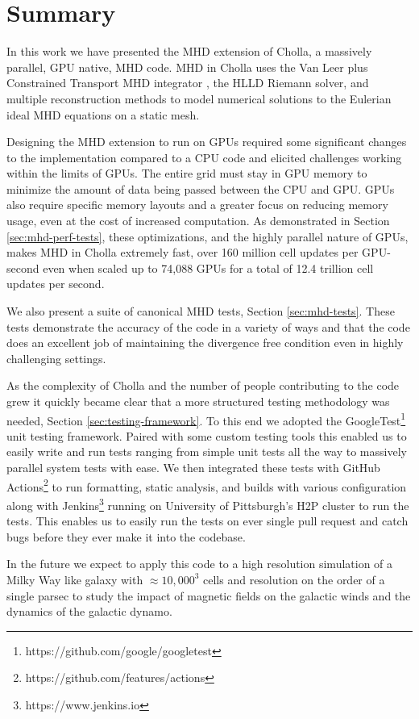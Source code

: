 \section{Summary}
\label{sec:summary}

In this work we have presented the MHD extension of Cholla, a massively parallel, GPU native, MHD code. MHD in Cholla uses the Van Leer plus Constrained Transport MHD integrator \citep{stone_2009}, the HLLD Riemann solver, and multiple reconstruction methods to model numerical solutions to the Eulerian ideal MHD equations on a static mesh.

Designing the MHD extension to run on GPUs required some significant changes to the implementation compared to a CPU code and elicited challenges working within the limits of GPUs. The entire grid must stay in GPU memory to minimize the amount of data being passed between the CPU and GPU. GPUs also require specific memory layouts and a greater focus on reducing memory usage, even at the cost of increased computation. As demonstrated in Section \ref{sec:mhd-perf-tests}, these optimizations, and the highly parallel nature of GPUs, makes MHD in Cholla extremely fast, over 160 million cell updates per GPU-second even when scaled up to 74,088 GPUs for a total of 12.4 trillion cell updates per second.

We also present a suite of canonical MHD tests, Section \ref{sec:mhd-tests}. These tests demonstrate the accuracy of the code in a variety of ways and that the code does an excellent job of maintaining the divergence free condition even in highly challenging settings. 

As the complexity of Cholla and the number of people contributing to the code grew it quickly became clear that a more structured testing methodology was needed, Section \ref{sec:testing-framework}. To this end we adopted the GoogleTest\footnote{https://github.com/google/googletest} unit testing framework. Paired with some custom testing tools this enabled us to easily write and run tests ranging from simple unit tests all the way to massively parallel system tests with ease. We then integrated these tests with GitHub Actions\footnote{https://github.com/features/actions} to run formatting, static analysis, and builds with various configuration along with Jenkins\footnote{https://www.jenkins.io} running on University of Pittsburgh's H2P cluster to run the tests. This enables us to easily run the tests on ever single pull request and catch bugs before they ever make it into the codebase.

In the future we expect to apply this code to a high resolution simulation of a Milky Way like galaxy with $\approx 10,000^3$ cells and resolution on the order of a single parsec to study the impact of magnetic fields on the galactic winds and the dynamics of the galactic dynamo.
